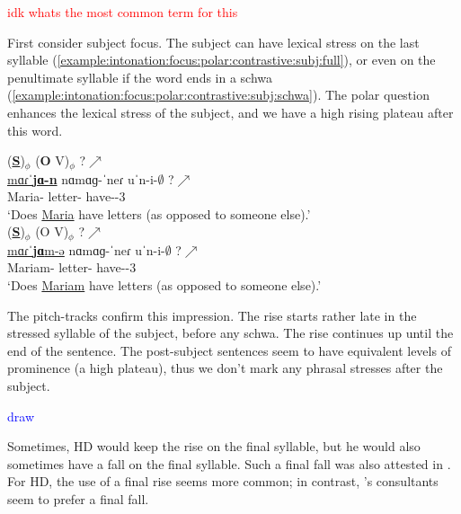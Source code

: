 \textcolor{red}{idk whats the most common term for this}

First consider subject focus. The subject can have lexical stress on   the last syllable (\ref{example:intonation:focus:polar:contrastive:subj:full}), or even on the penultimate syllable if the word ends in a schwa (\ref{example:intonation:focus:polar:contrastive:subj:schwa}). The polar question enhances the lexical stress of the subject, and we have a high rising plateau after this word. 

\begin{exe}
	\ex \begin{xlist}
		\ex \glll (\textbf{\underline{S}})$_\phi$ (\textbf{O} V)$_\phi$ ?$\nearrow$\\
		\underline{mɑɾˈ\textbf{jɑ-n}} nɑmɑɡ-ˈ{neɾ} uˈn-i-$\emptyset$ ?$\nearrow$ \\
		Maria-{} letter-{\pl} have-{\thgloss}-3{\sg} \\
		\trans `Does \underline{Maria} have letters (as opposed to someone else).'
		\label{example:intonation:focus:polar:contrastive:subj:full}
		\\ 
		\ex \glll (\textbf{\underline{S}})$_\phi$ ({O} V)$_\phi$ ?$\nearrow$\\
		\underline{mɑɾˈ\textbf{jɑ}m-ə} nɑmɑɡ-ˈ{neɾ} uˈn-i-$\emptyset$ ?$\nearrow$ \\
		Mariam-{} letter-{\pl} have-{\thgloss}-3{\sg} \\
		\trans `Does \underline{Mariam} have letters (as opposed to someone else).'
		\label{example:intonation:focus:polar:contrastive:subj:schwa}
		\\ 
	\end{xlist}
\end{exe}

The pitch-tracks confirm this impression. The rise starts rather late in the stressed syllable of the subject, before any schwa. The rise continues up until the end of the sentence. The post-subject sentences seem to have equivalent levels of prominence (a high plateau), thus we don't mark any phrasal stresses after the subject. 

\textcolor{blue}{draw}

Sometimes, HD would keep the rise on the final syllable, but he would also sometimes have a fall on the final syllable. Such a final fall was also attested in \citet{ToparlakDolatian-202x-IntonationFocusMarkingWesternArmenian}. For HD, the use of a final rise seems more common; in contrast, \citet{ToparlakDolatian-202x-IntonationFocusMarkingWesternArmenian}'s consultants seem to prefer a final fall. 

